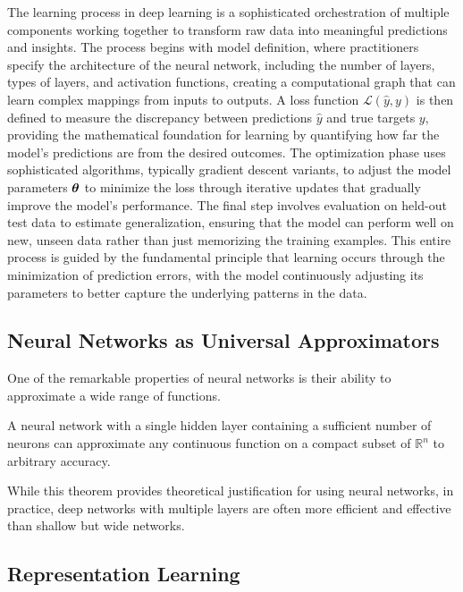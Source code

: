 The learning process in deep learning is a sophisticated orchestration of multiple components working together to transform raw data into meaningful predictions and insights. The process begins with model definition, where practitioners specify the architecture of the neural network, including the number of layers, types of layers, and activation functions, creating a computational graph that can learn complex mappings from inputs to outputs. A loss function $\mathcal{L}(\hat{y}, y)$ is then defined to measure the discrepancy between predictions $\hat{y}$ and true targets $y$, providing the mathematical foundation for learning by quantifying how far the model's predictions are from the desired outcomes. The optimization phase uses sophisticated algorithms, typically gradient descent variants, to adjust the model parameters $\boldsymbol{\theta}$ to minimize the loss through iterative updates that gradually improve the model's performance. The final step involves evaluation on held-out test data to estimate generalization, ensuring that the model can perform well on new, unseen data rather than just memorizing the training examples. This entire process is guided by the fundamental principle that learning occurs through the minimization of prediction errors, with the model continuously adjusting its parameters to better capture the underlying patterns in the data.

\subsection{Neural Networks as Universal Approximators}

One of the remarkable properties of neural networks is their ability to approximate a wide range of functions.

\begin{theorem}
A neural network with a single hidden layer containing a sufficient number of neurons can approximate any continuous function on a compact subset of $\mathbb{R}^n$ to arbitrary accuracy.
\end{theorem}

While this theorem provides theoretical justification for using neural networks, in practice, deep networks with multiple layers are often more efficient and effective than shallow but wide networks.

\subsection{Representation Learning}

